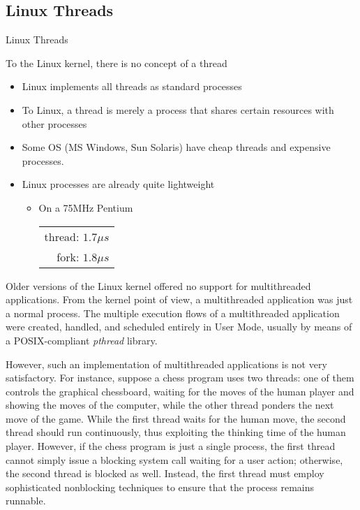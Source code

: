 \subsection{Linux Threads}
\label{sec:linux-threads}

\begin{frame}{Linux Threads}
  \begin{block}{To the Linux kernel, there is no concept of a thread}
    \begin{itemize}
    \item Linux implements all threads as standard processes
    \item To Linux, a thread is merely a process that shares certain resources with other
      processes
    \item Some OS (MS Windows, Sun Solaris) have cheap threads and expensive processes.
    \item Linux processes are already quite lightweight
      \begin{itemize}
      \item[] On a 75MHz Pentium
        \begin{tabular}{r}
          thread: $1.7\mu{}s$\\
          fork: $1.8\mu{}s$
        \end{tabular}
      \end{itemize}
    \end{itemize}
  \end{block}
\end{frame}


 Older versions of the Linux kernel offered no support
for multithreaded applications. From the kernel point of view, a multithreaded application
was just a normal process. The multiple execution flows of a multithreaded application
were created, handled, and scheduled entirely in User Mode, usually by means of a
POSIX-compliant \emph{pthread} library.

However, such an implementation of multithreaded applications is not very
satisfactory. For instance, suppose a chess program uses two threads: one of them controls
the graphical chessboard, waiting for the moves of the human player and showing the moves
of the computer, while the other thread ponders the next move of the game. While the first
thread waits for the human move, the second thread should run continuously, thus
exploiting the thinking time of the human player. However, if the chess program is just a
single process, the first thread cannot simply issue a blocking system call waiting for a
user action; otherwise, the second thread is blocked as well. Instead, the first thread
must employ sophisticated nonblocking techniques to ensure that the process remains
runnable.

